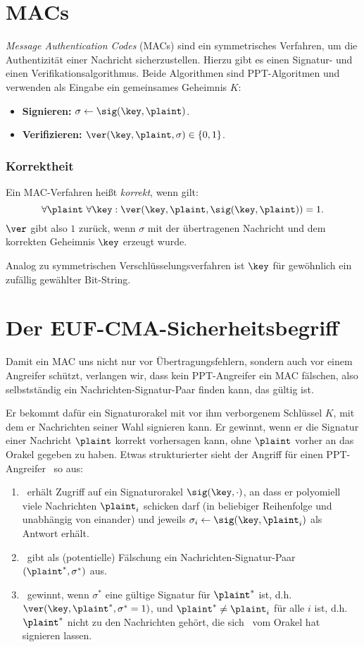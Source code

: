 \section{MACs}
\label{ch:symauth:macs} 
\textit{Message Authentication Codes} (MACs) sind ein symmetrisches
Verfahren, um die Authentizität einer Nachricht sicherzustellen. Hierzu
gibt es einen Signatur- und einen Verifikationsalgorithmus. Beide
Algorithmen sind PPT-Algoritmen und verwenden als Eingabe ein
gemeinsames Geheimnis $K$: 

\begin{itemize}
\item \textbf{Signieren:} $\sigma \leftarrow \sig(\key,\plaint)$.
\item \textbf{Verifizieren:} $\ver(\key,\plaint,\sigma) \in \{0,1\}$.
\end{itemize} 
\subsubsection*{Korrektheit}
Ein MAC-Verfahren heißt \textit{korrekt}, wenn gilt:
\[
\forall \plaint~\forall \key: \ver(\key, \plaint, \sig(\key, \plaint)) =1.
\]
$\ver$ gibt also $1$ zurück, wenn $\sigma$ mit der übertragenen
Nachricht und  dem korrekten Geheimnis $\key$ erzeugt wurde.

Analog zu symmetrischen Verschlüsselungsverfahren ist $\key$ für gewöhnlich
ein zufällig gewählter Bit-String.
\section{Der EUF-CMA-Sicherheitsbegriff}
\label{ch:symauth:sicherheit} Damit ein MAC uns nicht nur vor
Übertragungsfehlern, sondern auch vor einem Angreifer schützt, verlangen
wir, dass kein PPT-Angreifer ein MAC fälschen, also selbstständig ein Nachrichten-Signatur-Paar
finden kann, das gültig ist.

Er bekommt dafür ein Signaturorakel mit vor ihm verborgenem Schlüssel
$K$, mit dem er Nachrichten seiner Wahl signieren kann. Er gewinnt, wenn
er die Signatur einer Nachricht $\plaint$ korrekt vorhersagen kann, ohne $\plaint$
vorher an das Orakel gegeben zu haben. Etwas strukturierter sieht der
Angriff für einen PPT-Angreifer \A~so aus:
\begin{enumerate}
\item \A~erhält Zugriff auf ein Signaturorakel
  $\sig(\key,\cdot)$, an dass er polyomiell viele Nachrichten $\plaint_i$
  schicken darf (in beliebiger Reihenfolge und unabhängig von einander)
  und jeweils $\sigma_i \leftarrow \sig(\key, \plaint_i)$ als Antwort erhält.
\item \A~gibt als (potentielle) Fälschung ein Nachrichten-Signatur-Paar
  $(\plaint^*,\sigma^*)$ aus.
\item \A~gewinnt, wenn $\sigma^*$ eine gültige Signatur für
  $\plaint^*$ ist, d.h. $\ver(\key, \plaint^*, \sigma^* = 1)$, und $\plaint^*
  \neq \plaint_i$ für alle $i$ ist, d.h. $\plaint^*$ nicht zu den
  Nachrichten gehört, die sich \A~vom Orakel hat signieren lassen.
\end{enumerate} 

